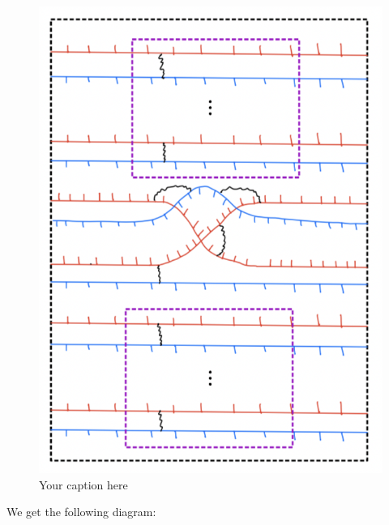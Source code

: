 \begin{figure}[H] %
    \centering
    \includegraphics[width=\linewidth]{diagrams/theorem12/7.png} %
    \caption{Your caption here}
    \label{fig:your-label}
\end{figure}

We get the following diagram:

